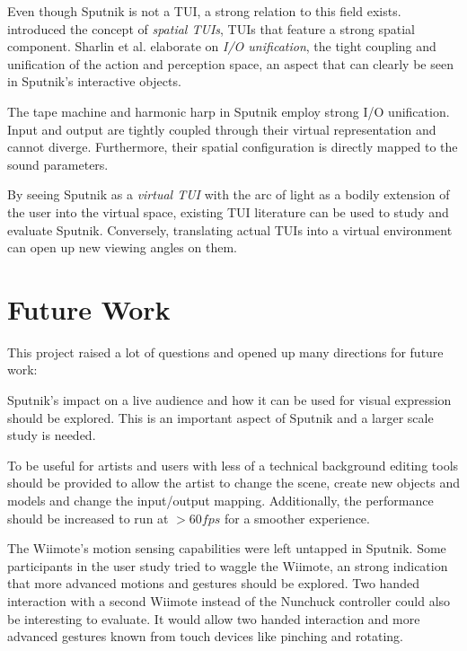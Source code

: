 \documentclass[10pt,a4paper]{scrartcl}
\begin{document}
Even though Sputnik is not a TUI, a strong relation to this field exists. \cite{Sharlin2004} introduced the concept of \emph{spatial TUIs}, TUIs that feature a strong spatial component. Sharlin et al. elaborate on \emph{I/O unification}, the tight coupling and unification of the action and perception space, an aspect that can clearly be seen in Sputnik's interactive objects.

The tape machine and harmonic harp in Sputnik employ strong I/O unification. Input and output are tightly coupled through their virtual representation and cannot diverge. Furthermore, their spatial configuration is directly mapped to the sound parameters. 

By seeing Sputnik as a \emph{virtual TUI} with the arc of light as a bodily extension of the user into the virtual space, existing TUI literature can be used to study and evaluate Sputnik. Conversely, translating actual TUIs into a virtual environment can open up new viewing angles on them.


\section{Future Work}

This project raised a lot of questions and opened up many directions for future work:

Sputnik's impact on a live audience and how it can be used for visual expression should be explored. This is an important aspect of Sputnik and a larger scale study is needed.

To be useful for artists and users with less of a technical background editing tools should be provided to allow the artist to change the scene, create new objects and models and change the input/output mapping. Additionally, the performance should be increased to run at $> 60fps$ for a smoother experience.

The Wiimote's motion sensing capabilities were left untapped in Sputnik. Some participants in the user study tried to waggle the Wiimote, an strong indication that more advanced motions and gestures should be explored. Two handed interaction with a second Wiimote instead of the Nunchuck controller could also be interesting to evaluate. It would allow two handed interaction and more advanced gestures known from touch devices like pinching and rotating. 
\end{document}
